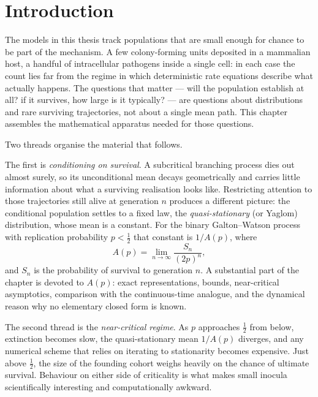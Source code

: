\section{Introduction}
\label{sec:intro}

The models in this thesis track populations that are small enough for chance to be part of the mechanism. A few colony-forming units deposited in a mammalian host, a handful of intracellular pathogens inside a single cell: in each case the count lies far from the regime in which deterministic rate equations describe what actually happens. The questions that matter --- will the population establish at all? if it survives, how large is it typically? --- are questions about distributions and rare surviving trajectories, not about a single mean path. This chapter assembles the mathematical apparatus needed for those questions.

Two threads organise the material that follows.

The first is \emph{conditioning on survival}. A subcritical branching process dies out almost surely, so its unconditional mean decays geometrically and carries little information about what a surviving realisation looks like. Restricting attention to those trajectories still alive at generation \(n\) produces a different picture: the conditional population settles to a fixed law, the \emph{quasi-stationary} (or Yaglom) distribution, whose mean is a constant. For the binary Galton--Watson process with replication probability \(p<\tfrac12\) that constant is \(1/A(p)\), where
\begin{equation*}
A(p) = \lim_{n\to\infty}\frac{S_n}{(2p)^n},
\end{equation*}
and \(S_n\) is the probability of survival to generation \(n\). A substantial part of the chapter is devoted to \(A(p)\): exact representations, bounds, near-critical asymptotics, comparison with the continuous-time analogue, and the dynamical reason why no elementary closed form is known.

The second thread is the \emph{near-critical regime}. As \(p\) approaches \(\tfrac12\) from below, extinction becomes slow, the quasi-stationary mean \(1/A(p)\) diverges, and any numerical scheme that relies on iterating to stationarity becomes expensive. Just above \(\tfrac12\), the size of the founding cohort weighs heavily on the chance of ultimate survival. Behaviour on either side of criticality is what makes small inocula scientifically interesting and computationally awkward.

